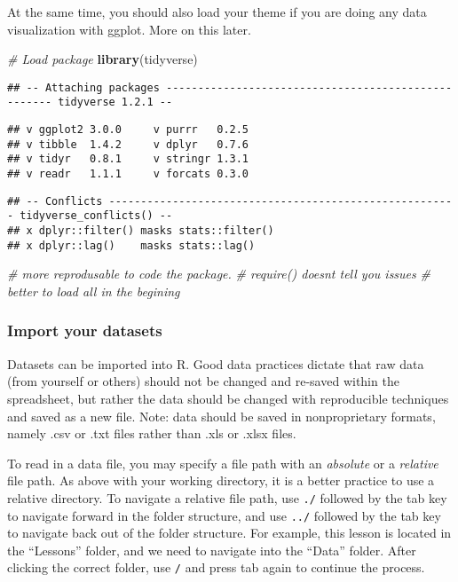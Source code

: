 \documentclass[]{article}
\newenvironment{Shaded}{\begin{snugshade}}{\end{snugshade}}
\newcommand{\KeywordTok}[1]{\textcolor[rgb]{0.13,0.29,0.53}{\textbf{#1}}}
\newcommand{\CommentTok}[1]{\textcolor[rgb]{0.56,0.35,0.01}{\textit{#1}}}
\newcommand{\NormalTok}[1]{#1}
\begin{document}
At the same time, you should also load your theme if you are doing any
data visualization with ggplot. More on this later.

\begin{Shaded}
\begin{Highlighting}[]
\CommentTok{# Load package}
\KeywordTok{library}\NormalTok{(tidyverse)}
\end{Highlighting}
\end{Shaded}

\begin{verbatim}
## -- Attaching packages ---------------------------------------------------- tidyverse 1.2.1 --
\end{verbatim}

\begin{verbatim}
## v ggplot2 3.0.0     v purrr   0.2.5
## v tibble  1.4.2     v dplyr   0.7.6
## v tidyr   0.8.1     v stringr 1.3.1
## v readr   1.1.1     v forcats 0.3.0
\end{verbatim}

\begin{verbatim}
## -- Conflicts ------------------------------------------------------- tidyverse_conflicts() --
## x dplyr::filter() masks stats::filter()
## x dplyr::lag()    masks stats::lag()
\end{verbatim}

\begin{Shaded}
\begin{Highlighting}[]
\CommentTok{# more reprodusable to code the package.}
\CommentTok{# require() doesnt tell you issues}
\CommentTok{# better to load all in the begining}
\end{Highlighting}
\end{Shaded}

\subsubsection{Import your datasets}\label{import-your-datasets}

Datasets can be imported into R. Good data practices dictate that raw
data (from yourself or others) should not be changed and re-saved within
the spreadsheet, but rather the data should be changed with reproducible
techniques and saved as a new file. Note: data should be saved in
nonproprietary formats, namely .csv or .txt files rather than .xls or
.xlsx files.

To read in a data file, you may specify a file path with an
\emph{absolute} or a \emph{relative} file path. As above with your
working directory, it is a better practice to use a relative directory.
To navigate a relative file path, use \texttt{./} followed by the tab
key to navigate forward in the folder structure, and use \texttt{../}
followed by the tab key to navigate back out of the folder structure.
For example, this lesson is located in the ``Lessons'' folder, and we
need to navigate into the ``Data'' folder. After clicking the correct
folder, use \texttt{/} and press tab again to continue the process.
\end{document}
